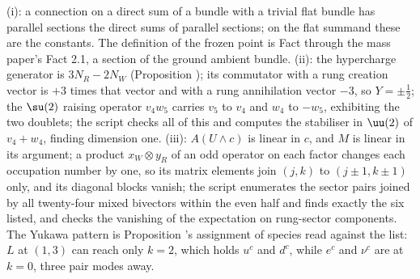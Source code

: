 (i): a connection on a direct sum of a bundle with a trivial flat bundle has parallel sections the direct sums of parallel sections; on the flat summand these are the constants. The definition of the frozen point is Fact  through the mass paper's Fact 2.1, a section of the ground ambient bundle. (ii): the hypercharge generator is $3N_{R} - 2N_{W}$ (Proposition ); its commutator with a rung creation vector is $+3$ times that vector and with a rung annihilation vector $-3$, so $Y = \pm\tfrac12$; the $\su(2)$ raising operator $v_{4}w_{5}$ carries $v_{5}$ to $v_{4}$ and $w_{4}$ to $-w_{5}$, exhibiting the two doublets; the script checks all of this and computes the stabiliser in $\uu(2)$ of $v_{4} + w_{4}$, finding dimension one. (iii): $A(U \wedge c)$ is linear in $c$, and $M$ is linear in its argument; a product $x_{W} \otimes y_{R}$ of an odd operator on each factor changes each occupation number by one, so its matrix elements join $(j,k)$ to $(j \pm 1, k \pm 1)$ only, and its diagonal blocks vanish; the script enumerates the sector pairs joined by all twenty-four mixed bivectors within the even half and finds exactly the six listed, and checks the vanishing of the expectation on rung-sector components. The Yukawa pattern is Proposition 's assignment of species read against the list: $L$ at $(1,3)$ can reach only $k = 2$, which holds $u^{c}$ and $d^{c}$, while $e^{c}$ and $\nu^{c}$ are at $k = 0$, three pair modes away.
